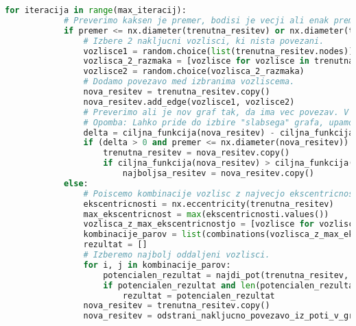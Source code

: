 \documentclass[12pt,a4paper]{amsart}
\theoremstyle{definition} %
\theoremstyle{plain} %
\begin{document}
\begin{lstlisting}[language=Python]
        for iteracija in range(max_iteracij):
            # Preverimo kaksen je premer, bodisi je vecji ali enak premeru trenutne resitve, bodisi pa je manjsi od 1. V zadnjem primeru je torej nepovezan graf. Dodamo povezavo.
            if premer <= nx.diameter(trenutna_resitev) or nx.diameter(trenutna_resitev) < 1:
                # Izbere 2 nakljucni vozlisci, ki nista povezani.
                vozlisce1 = random.choice(list(trenutna_resitev.nodes))
                vozlisca_2_razmaka = [vozlisce for vozlisce in trenutna_resitev.nodes - set([vozlisce1]) if nx.shortest_path_length(trenutna_resitev, source=vozlisce1, target=vozlisce) == 2]
                vozlisce2 = random.choice(vozlisca_2_razmaka)
                # Dodamo povezavo med izbranima vozliscema.
                nova_resitev = trenutna_resitev.copy()
                nova_resitev.add_edge(vozlisce1, vozlisce2) 
                # Preverimo ali je nov graf tak, da ima vec povezav. V primeru da je to res, posodobimo najboljso resitev, sicer pa z verjetnostjo izberemo ali bomo posodobili trenutno resitev ali ne.
                # Opomba: Lahko pride do izbire "slabsega" grafa, upamo, da nas bo ta "slabsi" vseeno pripeljal do boljse resitve v nadaljevanju.
                delta = ciljna_funkcija(nova_resitev) - ciljna_funkcija(trenutna_resitev)
                if (delta > 0 and premer <= nx.diameter(nova_resitev)) or random.random() < math.exp(-delta / temperatura):
                    trenutna_resitev = nova_resitev.copy()
                    if ciljna_funkcija(nova_resitev) > ciljna_funkcija(najboljsa_resitev) and premer == nx.diameter(nova_resitev):
                        najboljsa_resitev = nova_resitev.copy()
            else:
                # Poiscemo kombinacije vozlisc z najvecjo ekscentricnostjo.
                ekscentricnosti = nx.eccentricity(trenutna_resitev)  
                max_ekscentricnost = max(ekscentricnosti.values())
                vozlisca_z_max_ekscentricnostjo = [vozlisce for vozlisce, ekscentricnost in ekscentricnosti.items() if ekscentricnost == max_ekscentricnost]
                kombinacije_parov = list(combinations(vozlisca_z_max_ekscentricnostjo, 2))
                rezultat = []
                # Izberemo najbolj oddaljeni vozlisci.
                for i, j in kombinacije_parov:
                    potencialen_rezultat = najdi_pot(trenutna_resitev, i, j) 
                    if potencialen_rezultat and len(potencialen_rezultat) > len(rezultat):
                        rezultat = potencialen_rezultat
                nova_resitev = trenutna_resitev.copy()
                nova_resitev = odstrani_nakljucno_povezavo_iz_poti_v_grafu(trenutna_resitev.copy(), rezultat)

\end{lstlisting}
\end{document}
